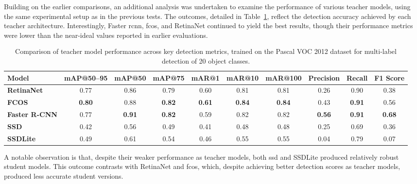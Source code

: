 Building on the earlier comparisons, an additional analysis was undertaken to examine the performance of various teacher models, using the same experimental setup as in the previous tests. The outcomes, detailed in Table~\ref{tab:teacher_model_metrics_pascal_voc}, reflect the detection accuracy achieved by each teacher architecture. Interestingly, Faster \gls{rcnn}, \gls{fcos}, and RetinaNet continued to yield the best results, though their performance metrics were lower than the near-ideal values reported in earlier evaluations.

\begin{table}[!htbp]
    \centering
    \begin{adjustbox}{max width=\textwidth}
    \renewcommand{\arraystretch}{1.5}
    \begin{tabular}{|l|c|c|c|c|c|c|c|c|c|}
        \hline
        \textbf{Model} & \textbf{mAP@50--95} & \textbf{mAP@50} & \textbf{mAP@75} & \textbf{mAR@1} & \textbf{mAR@10} & \textbf{mAR@100} & \textbf{Precision} & \textbf{Recall} & \textbf{F1 Score} \\ \hline \hline
        \textbf{RetinaNet} & 0.77 & 0.86 & 0.79 & 0.60 & 0.81 & 0.81 & 0.26 & 0.90 & 0.38 \\\hline
        \textbf{FCOS} & \textbf{0.80} & 0.88 & \textbf{0.82} & \textbf{0.61} & \textbf{0.84} & \textbf{0.84} & 0.43 & \textbf{0.91} & 0.56 \\\hline
        \textbf{Faster R-CNN} & 0.77 & \textbf{0.91} & \textbf{0.82} & 0.59 & 0.82 & 0.82 & \textbf{0.56} & \textbf{0.91} & \textbf{0.68} \\\hline
        \textbf{SSD} & 0.42 & 0.56 & 0.49 & 0.41 & 0.48 & 0.48 & 0.25 & 0.69 & 0.36 \\\hline
        \textbf{SSDLite} & 0.49 & 0.61 & 0.54 & 0.46 & 0.55 & 0.55 & 0.04 & 0.79 & 0.07 \\
        \hline
    \end{tabular}
    \renewcommand{\arraystretch}{1}
    \end{adjustbox}
    \caption{Comparison of teacher model performance across key detection metrics, trained on the Pascal VOC 2012 dataset for multi-label detection of 20 object classes.}
    \label{tab:teacher_model_metrics_pascal_voc}
\end{table}

A notable observation is that, despite their weaker performance as teacher models, both \gls{ssd} and SSDLite produced relatively robust student models. This outcome contrasts with RetinaNet and \gls{fcos}, which, despite achieving better detection scores as teacher models, produced less accurate student versions.

